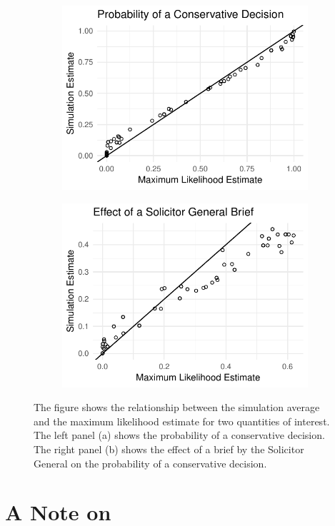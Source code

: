 \documentclass[11pt]{article}
\begin{document}
\begin{figure}[h!]
\begin{subfigure}{.5\textwidth}
  \centering
  \includegraphics[width=.8\linewidth]{figs/ge-pr.pdf}
  \caption{}
  \label{fig:ge1}
\end{subfigure}%
\begin{subfigure}{.5\textwidth}
  \centering
  \includegraphics[width=.8\linewidth]{figs/ge-fd.pdf}
  \caption{}
  \label{fig:ge2}
\end{subfigure}
\caption{The figure shows the relationship between the simulation average and the maximum likelihood estimate for two quantities of interest.
The left panel (a) shows the probability of a conservative decision.
The right panel (b) shows the effect of a brief by the Solicitor General on the probability of a conservative decision.}
\label{fig:ge}
\end{figure}

\section*{A Note on \cite{HanmerKalkan2013}}
\end{document}
